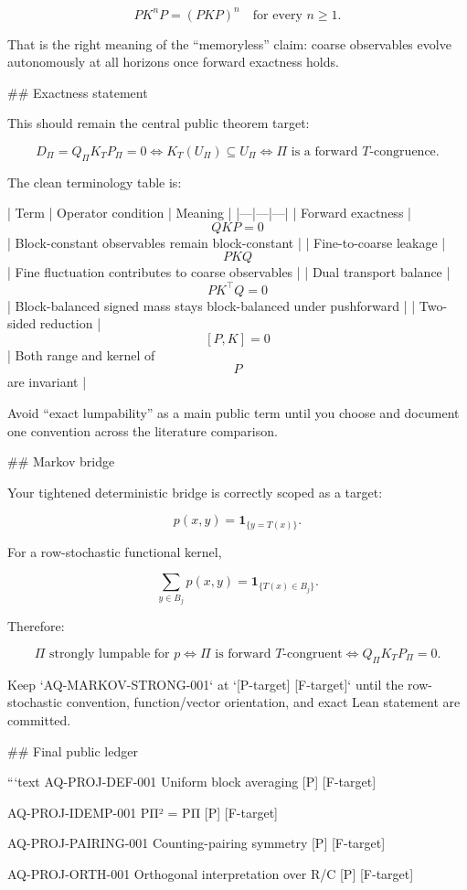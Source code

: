 $$
\boxed{
PK^nP=(PKP)^n
\quad\text{for every }n\ge1.
}
$$

That is the right meaning of the “memoryless” claim: coarse observables evolve autonomously at all horizons once forward exactness holds.

## Exactness statement

This should remain the central public theorem target:

$$
\boxed{
D_\Pi=Q_\Pi K_TP_\Pi=0
\iff
K_T(U_\Pi)\subseteq U_\Pi
\iff
\Pi\text{ is a forward }T\text{-congruence}.
}
$$

The clean terminology table is:

| Term | Operator condition | Meaning |
|---|---|---|
| Forward exactness | $$QKP=0$$ | Block-constant observables remain block-constant |
| Fine-to-coarse leakage | $$PKQ$$ | Fine fluctuation contributes to coarse observables |
| Dual transport balance | $$PK^\top Q=0$$ | Block-balanced signed mass stays block-balanced under pushforward |
| Two-sided reduction | $$[P,K]=0$$ | Both range and kernel of $$P$$ are invariant |

Avoid “exact lumpability” as a main public term until you choose and document one convention across the literature comparison.

## Markov bridge

Your tightened deterministic bridge is correctly scoped as a target:

$$
p(x,y)=\mathbf 1_{\{y=T(x)\}}.
$$

For a row-stochastic functional kernel,

$$
\sum_{y\in B_j}p(x,y)
=
\mathbf 1_{\{T(x)\in B_j\}}.
$$

Therefore:

$$
\boxed{
\Pi\text{ strongly lumpable for }p
\iff
\Pi\text{ is forward }T\text{-congruent}
\iff
Q_\Pi K_TP_\Pi=0.
}
$$

Keep `AQ-MARKOV-STRONG-001` at `[P-target] [F-target]` until the row-stochastic convention, function/vector orientation, and exact Lean statement are committed.

## Final public ledger

```text
AQ-PROJ-DEF-001
Uniform block averaging
[P] [F-target]

AQ-PROJ-IDEMP-001
PΠ² = PΠ
[P] [F-target]

AQ-PROJ-PAIRING-001
Counting-pairing symmetry
[P] [F-target]

AQ-PROJ-ORTH-001
Orthogonal interpretation over R/C
[P] [F-target]

